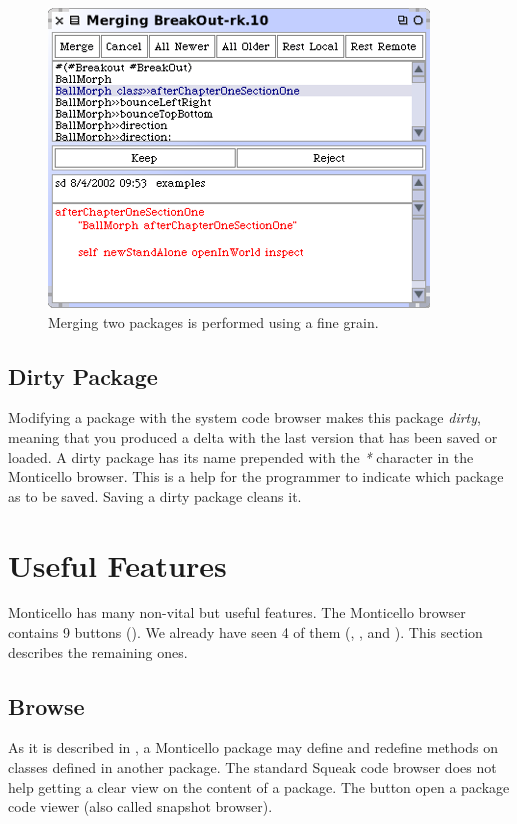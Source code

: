 \documentclass[a4paper,10pt,twoside]{book}
\begin{document}
\begin{figure}[ht]\centering
	\includegraphics[width=.75\linewidth]{merger}
	\caption{Merging two packages is performed using a fine grain.}
\end{figure}

\subsection{Dirty Package}

Modifying a package with the system code browser makes this package \emph{dirty}, meaning that you produced a delta with the last version that has been saved or loaded. A dirty package has its name prepended with the \emph{*} character in the Monticello browser. This is a help for the programmer to indicate which package as to be saved. Saving a dirty package cleans it.



\section{Useful Features} 

Monticello has many non-vital but useful features. The Monticello browser contains 9 buttons (). We already have seen 4 of them (, ,  and ). This section describes the remaining ones.

\subsection{Browse} 

As it is described in , a Monticello package may define and redefine methods on classes defined in another package. The standard Squeak code browser does not help getting a clear view on the content of a package. The  button open a package code viewer (also called snapshot browser).
\end{document}
